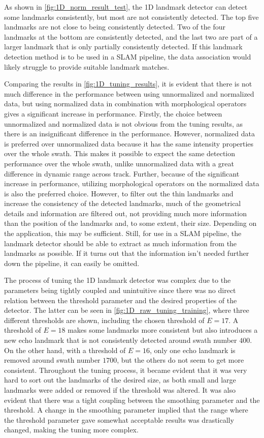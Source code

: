 As shown in \cref{fig:1D_norm_result_test}, the 1D landmark detector can detect some landmarks consistently, but most are not consistently detected. The top five landmarks are not close to being consistently detected. Two of the four landmarks at the bottom are consistently detected, and the last two are part of a larger landmark that is only partially consistently detected. If this landmark detection method is to be used in a SLAM pipeline, the data association would likely struggle to provide suitable landmark matches. 

Comparing the results in \cref{fig:1D_tuning_results}, it is evident that there is not much difference in the performance between using unnormalized and normalized data, but using normalized data in combination with morphological operators gives a significant increase in performance. Firstly, the choice between unnormalized and normalized data is not obvious from the tuning results, as there is an insignificant difference in the performance. However, normalized data is preferred over unnormalized data because it has the same intensity properties over the whole swath. This makes it possible to expect the same detection performance over the whole swath, unlike unnormalized data with a great difference in dynamic range across track. Further, because of the significant increase in performance, utilizing morphological operators on the normalized data is also the preferred choice. However, to filter out the thin landmarks and increase the consistency of the detected landmarks, much of the geometrical details and information are filtered out, not providing much more information than the position of the landmarks and, to some extent, their size. Depending on the application, this may be sufficient. Still, for use in a SLAM pipeline, the landmark detector should be able to extract as much information from the landmarks as possible. If it turns out that the information isn't needed further down the pipeline, it can easily be omitted. 

The process of tuning the 1D landmark detector was complex due to the parameters being tightly coupled and unintuitive since there was no direct relation between the threshold parameter and the desired properties of the detector. The latter can be seen in \cref{fig:1D_raw_tuning_training}, where three different thresholds are shown, including the chosen threshold of $E = 17$. A threshold of $E = 18$ makes some landmarks more consistent but also introduces a new echo landmark that is not consistently detected around swath number $400$. On the other hand, with a threshold of $E = 16$, only one echo landmark is removed around swath number $1700$, but the others do not seem to get more consistent. Throughout the tuning process, it became evident that it was very hard to sort out the landmarks of the desired size, as both small and large landmarks were added or removed if the threshold was altered. It was also evident that there was a tight coupling between the smoothing parameter and the threshold. A change in the smoothing parameter implied that the range where the threshold parameter gave somewhat acceptable results was drastically changed, making the tuning more complex. 

